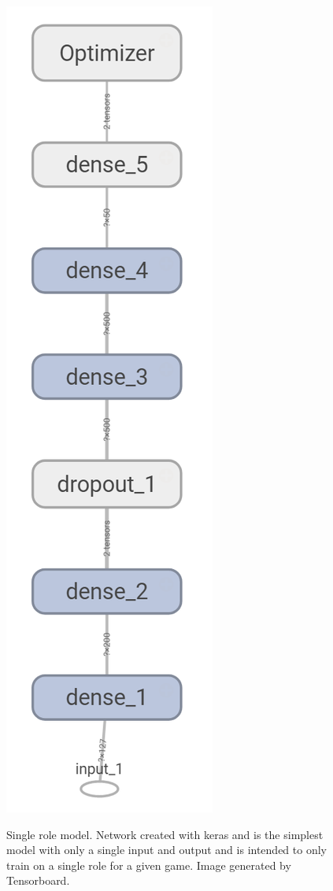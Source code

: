 \documentclass[twocolumn, letterpaper, 10 pt, conference]{ieeeconf}  %
\begin{document}
\begin{figure}[H]
    \centering
    \caption{Single role model. Network created with keras and is the simplest model with only a single input and output and is intended to only train on a single role for a given game. Image generated by Tensorboard. }
    \includegraphics[scale=0.5]{Images/single_role_keras.png}
    \label{fig:single_role_model}
\end{figure}
\end{document}
